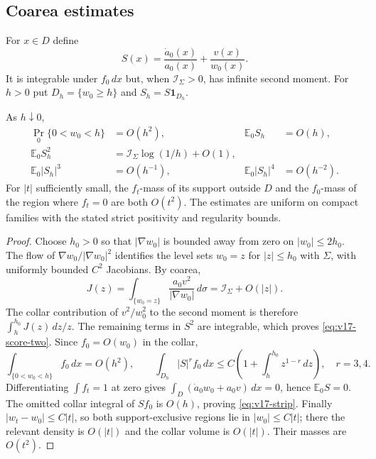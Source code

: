 \subsection{Coarea estimates}
For $x\in D$ define
\[
 S(x)=\frac{\dot a_0(x)}{a_0(x)}+\frac{v(x)}{w_0(x)}.
\]
It is integrable under $f_0\,dx$ but, when $\mathcal I_\Sigma>0$, has
infinite second moment.  For $h>0$ put
$D_h=\{w_0\ge h\}$ and $S_h=S\mathbf1_{D_h}$.

\begin{lemma}\label{lem:v17-coarea}
As $h\downarrow0$,
\begin{align}
 \Pr_0\{0<w_0<h\}&=O(h^2),& \mathbb E_0S_h&=O(h),
 \label{eq:v17-strip}\\
 \mathbb E_0S_h^2&=\mathcal I_\Sigma\log(1/h)+O(1),
 \label{eq:v17-score-two}\\
 \mathbb E_0|S_h|^3&=O(h^{-1}),&
 \mathbb E_0|S_h|^4&=O(h^{-2}).
 \label{eq:v17-score-higher}
\end{align}
For $|t|$ sufficiently small, the $f_t$-mass of its support outside $D$
and the $f_0$-mass of the region where $f_t=0$ are both $O(t^2)$.
The estimates are uniform on compact families with the stated strict
positivity and regularity bounds.
\end{lemma}

\begin{proof}
Choose $h_0>0$ so that $|\nabla w_0|$ is bounded away from zero on
$|w_0|\le2h_0$.  The flow of
$\nabla w_0/|\nabla w_0|^2$ identifies the level sets $w_0=z$ for
$|z|\le h_0$ with $\Sigma$, with uniformly bounded $C^2$ Jacobians.
By coarea,
\[
 J(z)=\int_{\{w_0=z\}}\frac{a_0v^2}{|\nabla w_0|}\,d\sigma
      =\mathcal I_\Sigma+O(|z|).
\]
The collar contribution of $v^2/w_0^2$ to the second moment is therefore
$\int_h^{h_0}J(z)\,dz/z$.  The remaining terms in $S^2$ are integrable,
which proves \eqref{eq:v17-score-two}.  Since $f_0=O(w_0)$ in the collar,
\[
 \int_{\{0<w_0<h\}}f_0\,dx=O(h^2),\qquad
 \int_{D_h}|S|^r f_0\,dx
 \le C\left(1+\int_h^{h_0}z^{1-r}\,dz\right),\quad r=3,4.
\]
Differentiating $\int f_t=1$ at zero gives
$\int_D(\dot a_0w_0+a_0v)\,dx=0$, hence $\mathbb E_0S=0$.
The omitted collar integral of $Sf_0$ is $O(h)$, proving
\eqref{eq:v17-strip}.  Finally $|w_t-w_0|\le C|t|$, so both
support-exclusive regions lie in $|w_0|\le C|t|$; there the relevant
density is $O(|t|)$ and the collar volume is $O(|t|)$.  Their masses are
$O(t^2)$.
\end{proof}

